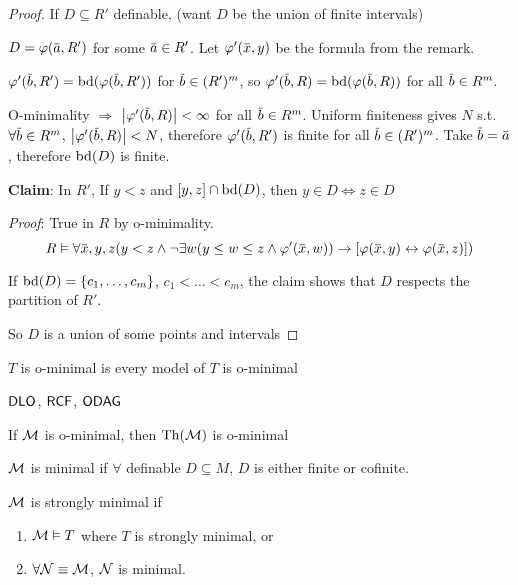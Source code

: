 \documentclass[11pt]{article}
\begin{document}
\begin{proof}
If \(D\subseteq R'\) definable, (want \(D\) be the union of finite intervals)

\(D=\varphi(\bara,R')\) for some \(\bara\in R'\). Let \(\varphi'(\barx,y)\) be the formula from the remark.

\(\varphi'(\barb,R')=\tbd(\varphi(\barb,R'))\) for \(\barb\in(R')^m\), so
\(\varphi'(\barb,R)=\tbd(\varphi(\barb,R))\) for all \(\barb\in R^m\).

O-minimality \(\Rightarrow\) \(\abs{\varphi'(\barb,R)}<\infty\) for all \(\barb\in R^m\). Uniform finiteness gives \(N\)
s.t. \(\forall \barb\in R^m\), \(\abs{\varphi'(\barb,R)}<N\), therefore \(\varphi'(\barb,R')\) is finite for
all \(\barb\in(R')^m\). Take \(\barb=\bara\), therefore \(\operatorname{bd}(D)\) is finite.

\textbf{Claim}: In \(R'\), If \(y<z\) and \([y,z]\cap\operatorname{bd}(D)\), then \(y\in D\Leftrightarrow z\in D\)

\emph{Proof}: True in \(R\) by o-minimality.
\begin{equation*}
R\vDash\forall\barx,y,z(y<z\wedge\neg\exists w(y\le w\le z\wedge\varphi'(\barx,w))\to[\varphi(\barx,y)\leftrightarrow\varphi(\barx,z)])
\end{equation*}

If \(\operatorname{bd}(D)=\{c_1,\dots,c_m\}\), \(c_1<\dots<c_m\), the claim shows that \(D\) respects the partition
of \(R'\).

So \(D\) is a union of some points and intervals
\end{proof}

\begin{definition}[]
\(T\) is o-minimal is every model of \(T\) is o-minimal
\end{definition}

\begin{examplle}[]
\(\operatorname{\textsf{DLO}}\), \(\textsf{RCF}\), \(\operatorname{\textsf{ODAG}}\)
\end{examplle}

\begin{theorem}[]
If \(\mathcal{M}\) is o-minimal, then \(\operatorname{Th}(\mathcal{M})\) is o-minimal
\end{theorem}

\begin{definition}[]
\(\mathcal{M}\) is minimal if \(\forall\) definable \(D\subseteq M\), \(D\) is either finite or cofinite.
\end{definition}

\begin{definition}[]
\(\mathcal{M}\) is strongly minimal if
\begin{enumerate}
\item \(\mathcal{M}\vDash T\) where \(T\) is strongly minimal, or
\item \(\forall\mathcal{N}\equiv\mathcal{M}\), \(\mathcal{N}\) is minimal.
\end{enumerate}
\end{definition}
\end{document}
